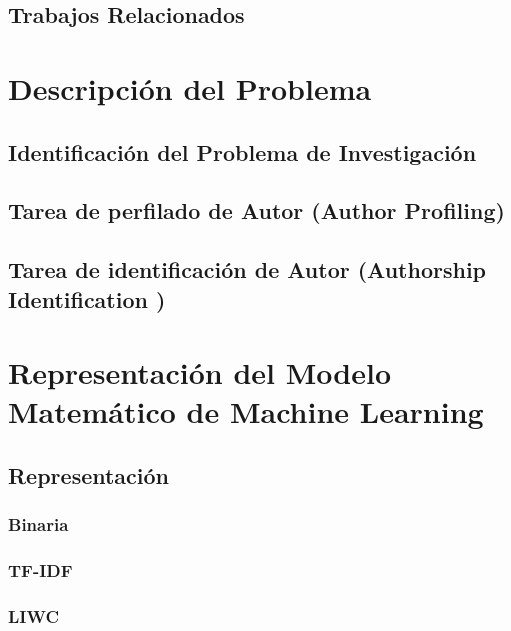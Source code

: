 \documentclass[12pt, runningheads,a4]{book}
\begin{document}
\section{Trabajos Relacionados}

\chapter{Descripción del Problema} \label{cap.3}

\section{Identificación del Problema de Investigación}


\section{Tarea de perfilado de Autor (Author Profiling)}


\section{Tarea de identificación de Autor (Authorship Identification )}

\chapter{Representación del Modelo Matemático de Machine Learning} \label{cap.4}

\section{Representación}

	\subsection{Binaria}

	\subsection{TF-IDF}

	\subsection{LIWC}
\end{document}
